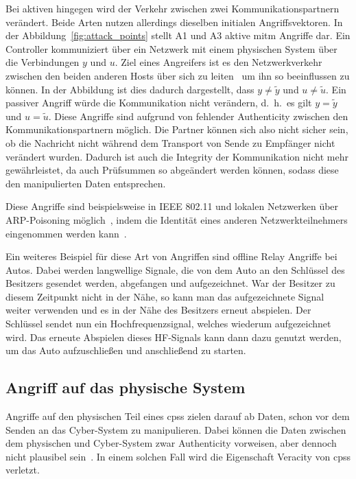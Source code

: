 \documentclass[final,bibliography=totocnumbered]{include/sikseminar}
\newcommand{\cps}{\glspl{cps}\xspace}
\begin{document}
    Bei aktiven hingegen wird der Verkehr zwischen zwei Kommunikationspartnern verändert.
    Beide Arten nutzen allerdings dieselben initialen Angriffsvektoren.
    In der Abbildung~\ref{fig:attack_points} stellt A1 und A3 aktive \gls{mitm} Angriffe dar.
    Ein Controller kommuniziert über ein Netzwerk mit einem physischen System über die Verbindungen $y$ und $u$.
    Ziel eines Angreifers ist es den Netzwerkverkehr zwischen den beiden anderen Hosts über sich zu leiten~\cite{WYX+10,FPA+18} um ihn so beeinflussen zu können.
    In der Abbildung ist dies dadurch dargestellt, dass $y \ne \tilde{y}$ und $u \ne \tilde{u}$.
    Ein passiver Angriff würde die Kommunikation nicht verändern, d.~h.\ es gilt $y = \tilde{y}$ und $u = \tilde{u}$.
    Diese Angriffe sind aufgrund von fehlender Authenticity zwischen den Kommunikationspartnern möglich.
    Die Partner können sich also nicht sicher sein, ob die Nachricht nicht während dem Transport von Sende zu Empfänger nicht verändert wurden.
    Dadurch ist auch die Integrity der Kommunikation nicht mehr gewährleistet, da auch Prüfsummen so abgeändert werden können, sodass diese den manipulierten Daten entsprechen.

    Diese Angriffe sind beispielsweise in IEEE 802.11 und lokalen Netzwerken über ARP-Poisoning möglich~\cite{FIT+12}, indem die Identität eines anderen Netzwerkteilnehmers eingenommen werden kann~\cite{RN05}.

    Ein weiteres Beispiel für diese Art von Angriffen sind offline Relay Angriffe bei Autos.
    Dabei werden langwellige Signale, die von dem Auto an den Schlüssel des Besitzers gesendet werden, abgefangen und aufgezeichnet.
    War der Besitzer zu diesem Zeitpunkt nicht in der Nähe, so kann man das aufgezeichnete Signal weiter verwenden und es in der Nähe des Besitzers erneut abspielen.
    Der Schlüssel sendet nun ein Hochfrequenzsignal, welches wiederum aufgezeichnet wird.
    Das erneute Abspielen dieses HF-Signals kann dann dazu genutzt werden, um das Auto aufzuschließen und anschließend zu starten.~\cite{HLL+17}

    \subsection{Angriff auf das physische System}
    \label{subsec:physical-deception}
    Angriffe auf den physischen Teil eines \cps zielen darauf ab Daten, schon vor dem Senden an das Cyber-System zu manipulieren.
    Dabei können die Daten zwischen dem physischen und Cyber-System zwar Authenticity vorweisen, aber dennoch nicht plausibel sein~\cite{SFJ17}.
    In einem solchen Fall wird die Eigenschaft Veracity von \cps verletzt.
\end{document}
